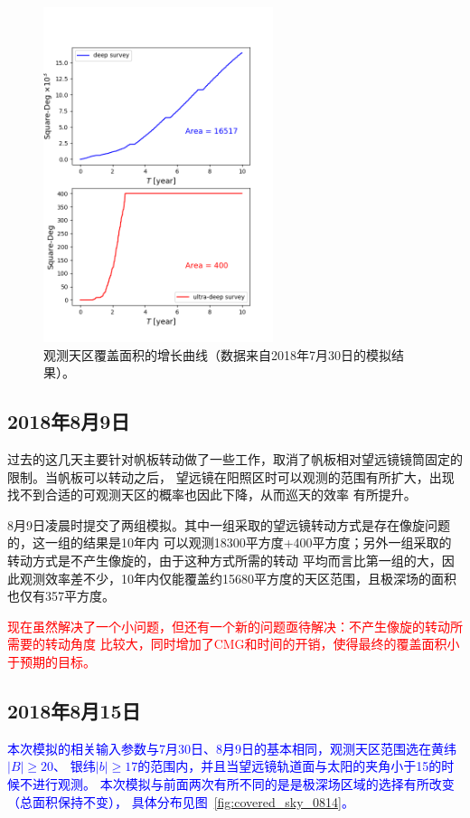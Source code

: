 \documentclass[a4paper,11pt]{ctexart}
\newcommand{\RT}[1]{\textcolor{red}{#1}}
\newcommand{\BT}[1]{\textcolor{blue}{#1}}
\begin{document}
\begin{figure}[h!]
\centering
\includegraphics[width=0.6\textwidth]{figures/area_E20_b17.png}
\caption{观测天区覆盖面积的增长曲线（数据来自2018年7月30日的模拟结果）。}
\label{fig:area_growth}
\end{figure}

\subsection{2018年8月9日}
过去的这几天主要针对帆板转动做了一些工作，取消了帆板相对望远镜镜筒固定的限制。当帆板可以转动之后，
望远镜在阳照区时可以观测的范围有所扩大，出现找不到合适的可观测天区的概率也因此下降，从而巡天的效率
有所提升。


8月9日凌晨时提交了两组模拟。其中一组采取的望远镜转动方式是存在像旋问题的，这一组的结果是10年内
可以观测18300平方度+400平方度；另外一组采取的转动方式是不产生像旋的，由于这种方式所需的转动
平均而言比第一组的大，因此观测效率差不少，10年内仅能覆盖约15680平方度的天区范围，且极深场的面积
也仅有357平方度。


\RT{\heiti 现在虽然解决了一个小问题，但还有一个新的问题亟待解决：不产生像旋的转动所需要的转动角度
比较大，同时增加了CMG和时间的开销，使得最终的覆盖面积小于预期的目标。}


\subsection{2018年8月15日}
\BT{本次模拟的相关输入参数与7月30日、8月9日的基本相同，观测天区范围选在黄纬$|B|\ge 20$\textdegree 、
银纬$|b|\ge 17$\textdegree 的范围内，并且当望远镜轨道面与太阳的夹角小于15\textdegree 的时候不进行观测。
本次模拟与前面两次有所不同的是是极深场区域的选择有所改变（总面积保持不变），
具体分布见图~\ref{fig:covered_sky_0814}。}
\end{document}
